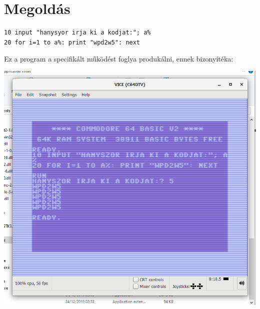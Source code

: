 \documentclass{article}[12pt,a4paper]
\begin{document}
\section{Megoldás}
\begin{lstlisting}
10 input "hanysyor irja ki a kodjat:"; a%
20 for i=1 to a%: print "wpd2w5": next 
\end{lstlisting}
Ez a program a specifikált működést foglya produkálni, ennek bizonyítéka:
\begin{center}
\includegraphics[scale=0.35]{graf2} 
\end{center}
\end{document}
